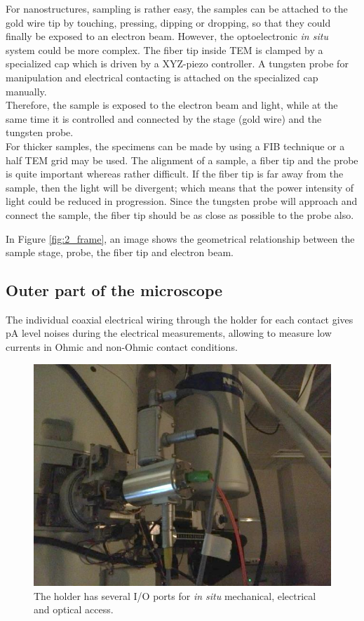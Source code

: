 For nanostructures, sampling is rather easy, the samples can be attached to the gold wire tip by touching, pressing, dipping or dropping, so that they could finally be exposed to an electron beam.
However, the optoelectronic {\em in situ} system could be more complex. The fiber tip inside TEM is clamped by a specialized cap which is driven by a XYZ-piezo controller. A tungsten probe for manipulation and electrical contacting is attached on the specialized cap manually. \\
Therefore, the sample is exposed to the electron beam and light, while at the same time it is controlled and connected by the stage (gold wire) and the tungsten probe. \\

For thicker samples, the specimens can be made by using a FIB technique or a half TEM grid may be used. 
The alignment of a sample, a fiber tip and the probe is quite important whereas rather difficult. If the fiber tip is far away from the sample, then the light will be divergent; which means that the power intensity of light could be reduced in progression. Since the tungsten probe will approach and connect the sample, the fiber tip should be as close as possible to the probe also. 

In Figure \ref{fig:2_frame}, an image shows the geometrical relationship between the sample stage, probe, the fiber tip and electron beam. 

\subsection{Outer part of the microscope}
The individual coaxial electrical wiring through the holder for each contact gives pA level noises during the electrical measurements, allowing to measure low currents in Ohmic and non-Ohmic contact conditions. 

\begin{figure}  
\centering
\includegraphics[width=\textwidth]{figures/figure2_holderbot}
\caption[Outside of holder]{The holder has several I/O ports for {\em in situ} mechanical, electrical and optical access.
\label{fig:2_bot}}
\end{figure}

